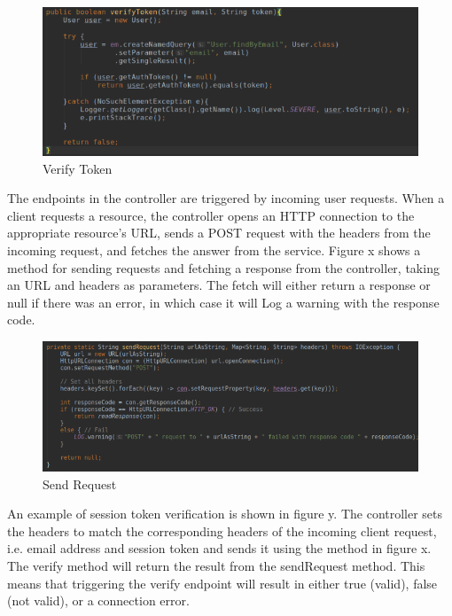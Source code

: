 \begin{figure}[ht]
  \centering
  \includegraphics[scale=0.9]{figs/verifytoken.png}
  \caption{Verify Token}
  \label{fig:verifytoken}
\end{figure}
\newpage
\noindent The endpoints in the controller are triggered by incoming user requests. When a client requests a resource, the controller opens an HTTP connection to the appropriate resource’s URL, sends a POST request with the headers from the incoming request, and fetches the answer from the service. Figure x shows a method for sending requests and fetching a response from the controller, taking an URL and headers as parameters. The fetch will either return a response or null if there was an error, in which case it will Log a warning with the response code. \\

\begin{figure}[ht]
  \centering
  \includegraphics[scale=0.75]{figs/sendrequest.png}
  \caption{Send Request}
  \label{fig:databaseconfig}
\end{figure}

\noindent An example of session token verification is shown in figure y. The controller sets the headers to match the corresponding headers of the incoming client request, i.e. email address and session token and sends it using the method in figure x. The verify method will return the result from the sendRequest method. This means that triggering the verify endpoint will result in either true (valid), false (not valid), or a connection error.\\

